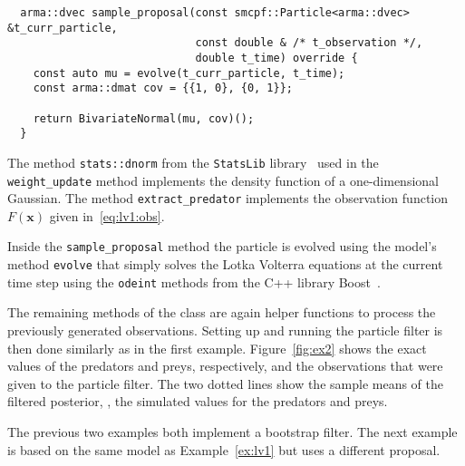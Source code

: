 \begin{example}
\begin{verbatim}
  arma::dvec sample_proposal(const smcpf::Particle<arma::dvec> &t_curr_particle,
                             const double & /* t_observation */,
                             double t_time) override {
    const auto mu = evolve(t_curr_particle, t_time);
    const arma::dmat cov = {{1, 0}, {0, 1}};

    return BivariateNormal(mu, cov)();
  }
\end{verbatim}
  The method \texttt{stats::dnorm} from the \texttt{StatsLib}
  library~\cite{stats} used in the \texttt{weight\_update} method
  implements the density function of a one-dimensional Gaussian. The
  method \texttt{extract\_predator} implements the observation
  function $F(\bm{x})$ given in~\eqref{eq:lv1:obs}.

  Inside the \texttt{sample\_proposal} method the particle is evolved
  using the model's method \texttt{evolve} that simply solves the
  Lotka Volterra equations at the current time step using the
  \texttt{odeint} methods from the C++ library Boost~\cite{boost}.

  The remaining methods of the class are again helper functions to
  process the previously generated observations. Setting up and
  running the particle filter is then done similarly as in the first
  example. Figure~\ref{fig:ex2} shows the exact values of the
  predators and preys, respectively, and the observations that were
  given to the particle filter. The two dotted lines show the sample
  means of the filtered posterior, \ie, the simulated values for the
  predators and preys.

\end{example}

The previous two examples both implement a bootstrap filter. The next
example is based on the same model as Example~\ref{ex:lv1} but uses a
different proposal.

